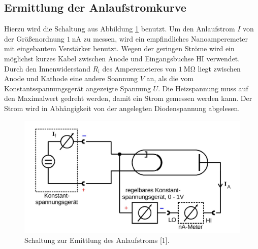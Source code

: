 \subsection{Ermittlung der Anlaufstromkurve}

Hierzu wird die Schaltung aus Abbildung \ref{fig:aufbau2} benutzt. Um den Anlaufstrom $I$ von 
der Größenordnung $\SI{1}{\nano\ampere}$ zu messen, wird ein empfindliches 
Nanoamperemeter mit eingebautem Verstärker benutzt. Wegen der geringen Ströme wird 
ein möglichst kurzes Kabel zwischen Anode und Eingangsbuchse HI verwendet. Durch 
den Innenwiderstand $R_\text{i}$ des Amperemeteres von $\SI{1}{\mega\ohm}$ liegt
zwischen Anode und Kathode eine andere Soannung $V$ an, als die vom 
Konstantsspannungsgerät angezeigte Spannung $U$. Die Heizspannung muss auf 
den Maximalwert gedreht werden, damit ein Strom gemessen werden kann. 
Der Strom wird in Abhängigkeit von der angelegten Diodenspannung abgelesen. 

\begin{figure}
  \centering
  \includegraphics[scale=0.2]{content/Aufbau2.jpg}
  \caption{Schaltung zur Emittlung des Anlaufstroms [1].}
  \label{fig:aufbau2}
\end{figure}